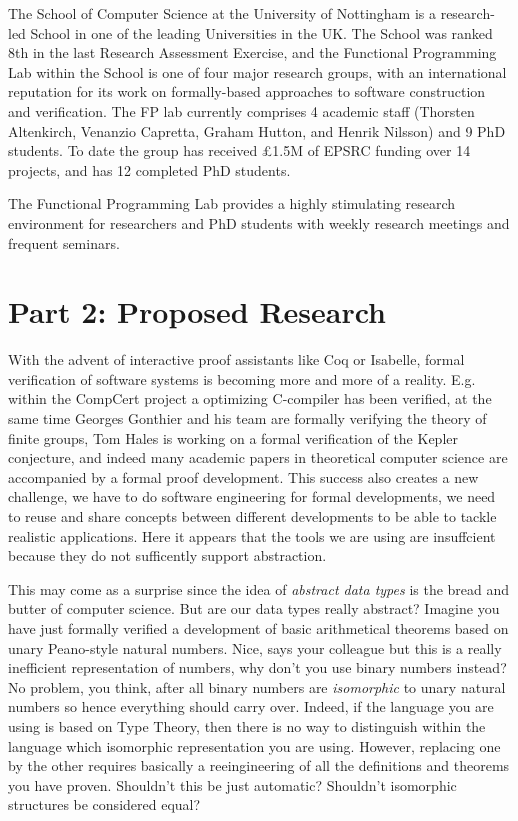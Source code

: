 \documentclass[twocolumn,a4paper,11pt]{article}
\begin{document}
The School of Computer Science at the University of Nottingham
is a research-led School in one of the leading Universities in
the UK. The School was ranked 8th in the last Research Assessment
Exercise, and the Functional Programming Lab within the School is
one of four major research groups, with an international reputation
for its work on formally-based approaches to software construction
and verification.  The FP lab currently comprises 4 academic staff
(Thorsten Altenkirch, Venanzio Capretta, Graham Hutton, and Henrik
Nilsson) and 9 PhD students.  To date the
group has received \pounds 1.5M of EPSRC funding over 14 projects,
and has 12 completed PhD students.

The Functional Programming Lab provides a highly stimulating
research environment for researchers and PhD students with weekly
research meetings and frequent seminars. 



\newpage

\section*{Part 2: Proposed Research}

With the advent of interactive proof assistants like Coq or Isabelle,
formal verification of software systems is becoming more and more of a
reality. E.g. within the CompCert project a optimizing C-compiler has
been verified, at the same time Georges Gonthier and his team are
formally verifying the theory of finite groups, Tom Hales is
working on a formal verification of the Kepler conjecture, and indeed
many academic papers in theoretical computer science are accompanied
by a formal proof development. This success also creates a new
challenge, we have to do software engineering for formal developments,
we need to reuse and share concepts between different developments to
be able to tackle realistic applications. Here it appears that the
tools we are using are insuffcient because they do not sufficently
support abstraction. 

This may come as a surprise since the idea of \emph{abstract data
  types} is the bread and butter of computer science. But are our data
types really abstract? Imagine you have just formally verified a
development of basic arithmetical theorems based on unary Peano-style
natural numbers. Nice, says your colleague but this is a really
inefficient representation of numbers, why don't you use binary
numbers instead? No problem, you think, after all binary numbers are
\emph{isomorphic} to unary natural numbers so hence everything should
carry over. Indeed, if the language you are using is based on Type
Theory, then there is no way to distinguish within the language which
isomorphic representation you are using. However, replacing one by the other
requires basically a reeingineering of all the definitions and
theorems you have proven. Shouldn't this be just automatic? Shouldn't
isomorphic structures be considered equal?
\end{document}
